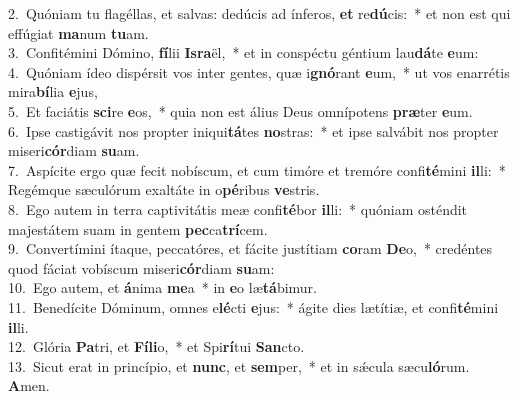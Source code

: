 {2.~}Quóniam tu flagéllas, et salvas: dedúcis ad ínferos, \textbf{et} re\textbf{dú}cis:~* et non est qui effúgiat \textbf{ma}num \textbf{tu}am.\\
{3.~}Confitémini Dómino, \textbf{fí}lii \textbf{Is}\textbf{ra}ël,~* et in conspéctu géntium lau\textbf{dá}te \textbf{e}um:\\
{4.~}Quóniam ídeo dispérsit vos inter gentes, quæ i\textbf{gnó}rant \textbf{e}um,~* ut vos enarrétis mira\textbf{bí}lia \textbf{e}jus,\\
{5.~}Et faciátis \textbf{sci}re \textbf{e}os,~* quia non est álius Deus omnípotens \textbf{præ}ter \textbf{e}um.\\
{6.~}Ipse castigávit nos propter iniqui\textbf{tá}tes \textbf{no}stras:~* et ipse salvábit nos propter miseri\textbf{cór}diam \textbf{su}am.\\
{7.~}Aspícite ergo quæ fecit nobíscum, et cum timóre et tremóre confi\textbf{té}mini \textbf{il}li:~* Regémque sæculórum exaltáte in o\textbf{pé}ribus \textbf{ve}stris.\\
{8.~}Ego autem in terra captivitátis meæ confi\textbf{té}bor \textbf{il}li:~* quóniam osténdit majestátem suam in gentem \textbf{pec}ca\textbf{trí}cem.\\
{9.~}Convertímini ítaque, peccatóres, et fácite justítiam \textbf{co}ram \textbf{De}o,~* credéntes quod fáciat vobíscum miseri\textbf{cór}diam \textbf{su}am:\\
{10.~}Ego autem, et \textbf{á}nima \textbf{me}a~* in \textbf{e}o læ\textbf{tá}bimur.\\
{11.~}Benedícite Dóminum, omnes e\textbf{lé}cti \textbf{e}jus:~* ágite dies lætítiæ, et confi\textbf{té}mini \textbf{il}li.\\
{12.~}Glória \textbf{Pa}tri, et \textbf{Fí}\textbf{li}o,~* et Spi\textbf{rí}tui \textbf{San}cto.\\
{13.~}Sicut erat in princípio, et \textbf{nunc}, et \textbf{sem}per,~* et in sǽcula sæcu\textbf{ló}rum. \textbf{A}men.\\

